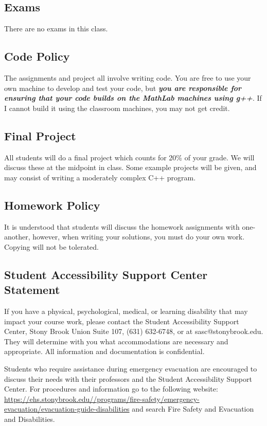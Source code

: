 \documentclass[10pt]{article}
\begin{document}
\subsection*{Exams}

\noindent There are no exams in this class.

\subsection*{Code Policy}

The assignments and project all involve writing code.  You are
free to use your own machine to develop and test your code, but
{\em \bfseries you are responsible for ensuring that your code builds on the
MathLab machines using g++}.  If I cannot build it using the classroom
machines, you may not get credit.

\subsection*{Final Project}

\noindent All students will do a final project which counts for 20\%
of your grade.  We will discuss these at the midpoint in class.  Some
example projects will be given, and may consist of writing a moderately
complex C++ program.

\subsection*{Homework Policy}

\noindent It is understood that students will discuss the homework
assignments with one-another, however, when writing your solutions,
you must do your own work.  Copying will not be tolerated.


\subsection*{Student Accessibility Support Center Statement}

If you have a physical, psychological, medical, or learning disability
that may impact your course work, please contact the Student
Accessibility Support Center, Stony Brook Union Suite 107, (631)
632-6748, or at sasc@stonybrook.edu. They will determine with you what
accommodations are necessary and appropriate. All information and
documentation is confidential.

Students who require assistance during emergency evacuation are
encouraged to discuss their needs with their professors and the
Student Accessibility Support Center. For procedures and information
go to the following website:\\
{\small \url{https://ehs.stonybrook.edu//programs/fire-safety/emergency-evacuation/evacuation-guide-disabilities}}\linebreak
and search Fire Safety and Evacuation and Disabilities.
\end{document}
